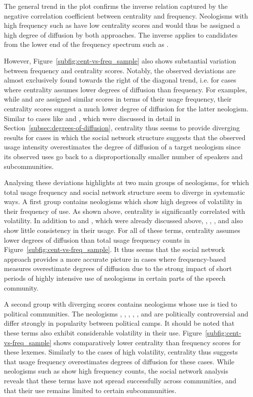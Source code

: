 \documentclass[
  a4paper,
  abstract=on,
  captions=tableabove
  ]{scrartcl}
\begin{document}
      The general trend in the plot confirms the inverse relation captured by the negative correlation coefficient between centrality and frequency. Neologisms with high frequency such as  have low centrality scores and would thus be assigned a high degree of diffusion by both approaches. The inverse applies to candidates from the lower end of the frequency spectrum such as .

      However, Figure~\ref{subfig:cent-vs-freq_sample} also shows substantial variation between frequency and centrality scores. Notably, the observed deviations are almost exclusively found towards the right of the diagonal trend, i.e. for cases where centrality assumes lower degrees of diffusion than frequency. For examples, while  and  are assigned similar scores in terms of their usage frequency, their centrality scores suggest a much lower degree of diffusion for the latter neologism. Similar to cases like  and , which were discussed in detail in Section~\ref{subsec:degrees-of-diffusion}, centrality thus seems to provide diverging results for cases in which the social network structure suggests that the observed usage intensity overestimates the degree of diffusion of a target neologism since its observed uses go back to a disproportionally smaller number of speakers and subcommunities.

      Analysing these deviations highlights at two main groups of neologisms, for which total usage frequency and social network structure seem to diverge in systematic ways. A first group contains neologisms which show high degrees of volatility in their frequency of use. As shown above, centrality is significantly correlated with volatility. In addition to  and , which were already discussed above, , , , and  also show little consistency in their usage. For all of these terms, centrality assumes lower degrees of diffusion than total usage frequency counts in Figure~\ref{subfig:cent-vs-freq_sample}. It thus seems that the social network approach provides a more accurate picture in cases where frequency-based measures overestimate degrees of diffusion due to the strong impact of short periods of highly intensive use of neologisms in certain parts of the speech community.

      A second group with diverging scores contains neologisms whose use is tied to political communities. The neologisms , , , , , and  are politically controversial and differ strongly in popularity between political camps. It should be noted that these terms also exhibit considerable volatility in their use. Figure~\ref{subfig:cent-vs-freq_sample} shows comparatively lower centrality than frequency scores for these lexemes. Similarly to the cases of high volatility, centrality thus suggests that usage frequency overestimates degrees of diffusion for these cases. While neologisms such as  show high frequency counts, the social network analysis reveals that these terms have not spread successfully across communities, and that their use remains limited to certain subcommunities.
\end{document}
